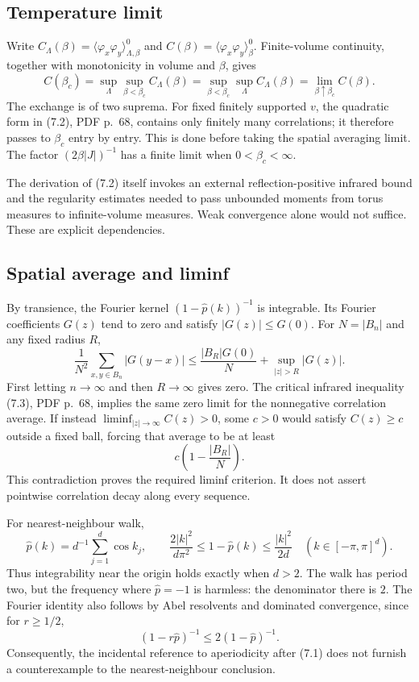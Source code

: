 \documentclass[10pt]{article}
\begin{document}
\subsection*{Temperature limit}
Write \(C_\Lambda(\beta)=\langle\varphi_x\varphi_y\rangle_{\Lambda,\beta}^0\) and \(C(\beta)=\langle\varphi_x\varphi_y\rangle_\beta^0\). Finite-volume continuity, together with monotonicity in volume and \(\beta\), gives \[C(\beta_c)
 =\sup_\Lambda\sup_{\beta<\beta_c}C_\Lambda(\beta)
 =\sup_{\beta<\beta_c}\sup_\Lambda C_\Lambda(\beta)
 =\lim_{\beta\uparrow\beta_c}C(\beta).\] The exchange is of two suprema. For fixed finitely supported \(v\), the quadratic form in (7.2), PDF p. 68, contains only finitely many correlations; it therefore passes to \(\beta_c\) entry by entry. This is done before taking the spatial averaging limit. The factor \((2\beta|J|)^{-1}\) has a finite limit when \(0<\beta_c<\infty\).\par
The derivation of (7.2) itself invokes an external reflection-positive infrared bound and the regularity estimates needed to pass unbounded moments from torus measures to infinite-volume measures. Weak convergence alone would not suffice. These are explicit dependencies.\par
\subsection*{Spatial average and liminf}
By transience, the Fourier kernel \((1-\widehat p(k))^{-1}\) is integrable. Its Fourier coefficients \(G(z)\) tend to zero and satisfy \(|G(z)|\le G(0)\). For \(N=|B_n|\) and any fixed radius \(R\), \[\frac1{N^2}\sum_{x,y\in B_n}|G(y-x)|
 \le \frac{|B_R|G(0)}N+\sup_{|z|>R}|G(z)|.\] First letting \(n\to\infty\) and then \(R\to\infty\) gives zero. The critical infrared inequality (7.3), PDF p. 68, implies the same zero limit for the nonnegative correlation average. If instead \(\liminf_{|z|\to\infty}C(z)>0\), some \(c>0\) would satisfy \(C(z)\ge c\) outside a fixed ball, forcing that average to be at least \[c\left(1-\frac{|B_R|}{N}\right).\] This contradiction proves the required liminf criterion. It does not assert pointwise correlation decay along every sequence.\par
For nearest-neighbour walk, \[\widehat p(k)=d^{-1}\sum_{j=1}^d\cos k_j,\qquad
 \frac{2|k|^2}{d\pi^2}\le1-\widehat p(k)\le\frac{|k|^2}{2d}
 \quad(k\in[-\pi,\pi]^d).\] Thus integrability near the origin holds exactly when \(d>2\). The walk has period two, but the frequency where \(\widehat p=-1\) is harmless: the denominator there is \(2\). The Fourier identity also follows by Abel resolvents and dominated convergence, since for \(r\ge1/2\), \[(1-r\widehat p)^{-1}\le 2(1-\widehat p)^{-1}.\] Consequently, the incidental reference to aperiodicity after (7.1) does not furnish a counterexample to the nearest-neighbour conclusion.\par
\end{document}
